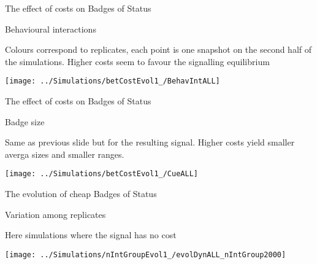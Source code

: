 \documentclass[
  ignorenonframetext,
]{beamer}
\begin{document}
\begin{frame}{The effect of costs on Badges of Status}
\protect\hypertarget{the-effect-of-costs-on-badges-of-status}{}

\begin{block}{Behavioural interactions}

\small

Colours correspond to replicates, each point is one snapshot on the
second half of the simulations. Higher costs seem to favour the
signalling equilibrium

\begin{center}\texttt{[image: ../Simulations/betCostEvol1\_/BehavIntALL]} \end{center}

\end{block}

\end{frame}

\begin{frame}{The effect of costs on Badges of Status}
\protect\hypertarget{the-effect-of-costs-on-badges-of-status-1}{}

\begin{block}{Badge size}

\small

Same as previous slide but for the resulting signal. Higher costs yield
smaller averga sizes and smaller ranges.

\begin{center}\texttt{[image: ../Simulations/betCostEvol1\_/CueALL]} \end{center}

\end{block}

\end{frame}

\begin{frame}{The evolution of cheap Badges of Status}
\protect\hypertarget{the-evolution-of-cheap-badges-of-status}{}

\begin{block}{Variation among replicates}

\small

Here simulations where the signal has no cost

\begin{center}\texttt{[image: ../Simulations/nIntGroupEvol1\_/evolDynALL\_nIntGroup2000]} \end{center}

\end{block}

\end{frame}
\end{document}
